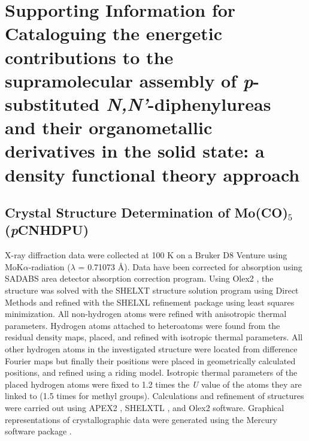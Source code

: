\chapter{Supporting Information for Cataloguing the energetic contributions to the supramolecular assembly of \textit{p}-substituted \textit{N,N'}-diphenylureas and their organometallic derivatives in the solid state: a density functional theory approach}
\label{chap:cataloguing_SI}

\newpage %

\section{Crystal Structure Determination of \texorpdfstring{Mo(CO)$_{5}$}{Mo(CO)5}(\textit{p}CNHDPU)}
X-ray diffraction data were collected at 100 K on a Bruker D8 Venture using MoK$\alpha$-radiation ($\lambda$ = 0.71073 \AA). Data have been corrected for absorption using SADABS \citep{Sheldrick1996} area detector absorption correction program. Using Olex2 \citep{Dolomanov2009}, the structure was solved with the SHELXT \citep{Sheldrick2015a} structure solution program using Direct Methods and refined with the SHELXL \citep{Sheldrick2015} refinement package using least squares minimization. All non-hydrogen atoms were refined with anisotropic thermal parameters. Hydrogen atoms attached to heteroatoms were found from the residual density maps, placed, and refined with isotropic thermal parameters. All other hydrogen atoms in the investigated structure were located from difference Fourier maps but finally their positions were placed in geometrically calculated positions, and refined using a riding model. Isotropic thermal parameters of the placed hydrogen atoms were fixed to 1.2 times the \textit{U} value of the atoms they are linked to (1.5 times for methyl groups). Calculations and refinement of structures were carried out using APEX2 \citep{Bruker2016}, SHELXTL \citep{Sheldrick2008}, and Olex2 software. Graphical representations of crystallographic data were generated using the Mercury software package \citep{Macrae2008a}. 
